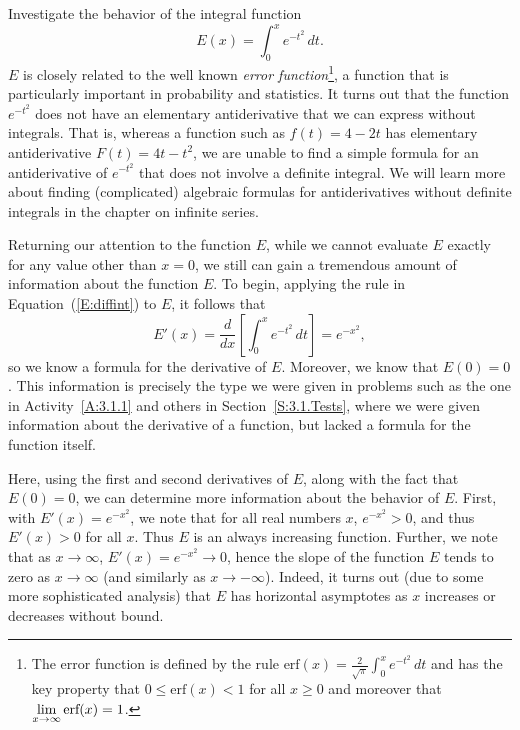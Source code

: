 \bex  Investigate the behavior of the integral function 
$$E(x) = \int_0^x e^{-t^2} \, dt.$$
\eex
$E$ is closely related to the well known \emph{error function}\footnote{The error function is defined by the rule $\mbox{erf}(x) = \frac{2}{\sqrt{\pi}} \int_0^x e^{-t^2} \,dt$ and has the key property that $0 \le \mbox{erf}(x) < 1$ for all $x \ge 0$ and moreover that $\displaystyle \lim_{x \to \infty} \mbox{erf}(x) = 1$.}, a function that is particularly important in probability and statistics.  It turns out that the function $e^{-t^2}$ does not have an elementary antiderivative that we can express without integrals.  That is, whereas a function such as $f(t) = 4-2t$ has elementary antiderivative $F(t) = 4t - t^2$, we are unable to find a simple formula for an antiderivative of $e^{-t^2}$ that does not involve a definite integral.  We will learn more about finding (complicated) algebraic formulas for antiderivatives without definite integrals in the chapter on infinite series.

Returning our attention to the function $E$, while we cannot evaluate $E$ exactly for any value other than $x = 0$, %
we still can gain a tremendous amount of information about the function $E$.  To begin, applying the rule in Equation~(\ref{E:diffint}) to $E$, it follows that
$$E'(x) = \frac{d}{dx} \left[ \int_0^x e^{-t^2} \, dt \right] = e^{-x^2},$$
so we know a formula for the derivative of $E$.  Moreover, we know that $E(0) = 0$.  This information is precisely the type we were given in problems such as the one in Activity~\ref{A:3.1.1} and others in Section~\ref{S:3.1.Tests}, where we were given information about the derivative of a function, but lacked a formula for the function itself.  

Here, using the first and second derivatives of $E$, along with the fact that $E(0) = 0$, we can determine more information about the behavior of $E$.  First, with $E'(x) = e^{-x^2}$, we note that for all real numbers $x$, $e^{-x^2} > 0$, and thus $E'(x) > 0$ for all $x$.  Thus $E$ is an always increasing function.  Further, we note that as $x \to \infty$, $E'(x) = e^{-x^2} \to 0$, hence the slope of the function $E$ tends to zero as $x \to \infty$ (and similarly as $x \to -\infty$).  Indeed, it turns out (due to some more sophisticated analysis) that $E$ has horizontal asymptotes as $x$ increases or decreases without bound. 

